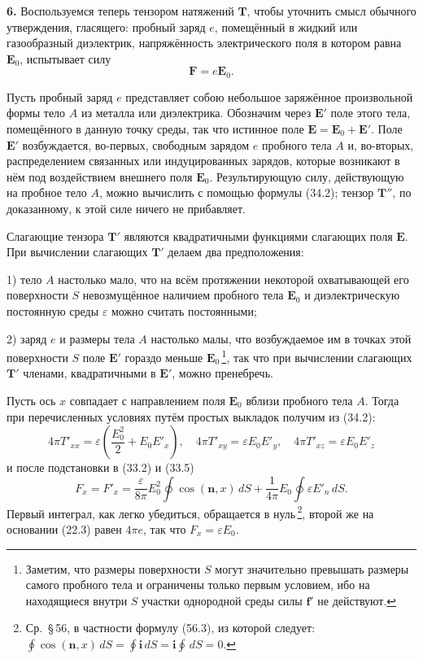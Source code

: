 \documentclass[a4paper,10pt]{article}
\begin{document}
\textbf{6.} Воспользуемся теперь тензором натяжений $\mathbf{T}$, чтобы
уточнить смысл обычного утверждения, гласящего: пробный заряд $e$,
помещённый в жидкий или газообразный диэлектрик, напряжённость
электрического поля в котором равна $\mathbf{E}_0$, испытывает силу
\begin{equation}
    \mathbf{F} = e\mathbf{E}_0.
    \tag{34.9}
\end{equation}

Пусть пробный заряд $e$ представляет собою небольшое заряжённое
произвольной формы тело $A$ из металла или диэлектрика. Обозначим через
$\mathbf{E}'$ поле этого тела, помещённого в данную точку среды, так
что истинное поле $\mathbf{E} = \mathbf{E}_0 + \mathbf{E}'$. Поле
$\mathbf{E}'$ возбуждается, во-первых, свободным зарядом $e$ пробного
тела $A$ и, во-вторых, распределением связанных или индуцированных
зарядов, которые возникают в нём под воздействием внешнего поля
$\mathbf{E}_0$. Результирующую силу, действующую на пробное тело $A$,
можно вычислить с помощью формулы (34.2); тензор $\mathbf{T}''$, по
доказанному, к этой силе ничего не прибавляет.

Слагающие тензора $\mathbf{T}'$ являются квадратичными функциями
слагающих поля $\mathbf{E}$. При вычислении слагающих $\mathbf{T}'$
делаем два предположения:

1) тело $A$ настолько мало, что на всём протяжении некоторой
охватывающей его поверхности $S$ невозмущённое наличием пробного тела
$\mathbf{E}_0$ и диэлектрическую постоянную среды $\varepsilon$ можно
считать постоянными;

2) заряд $e$ и размеры тела $A$ настолько малы, что возбуждаемое им
в точках этой поверхности $S$ поле $\mathbf{E}'$ гораздо меньше
$\mathbf{E}_0$\,\footnote{Заметим, что размеры поверхности $S$ могут
значительно превышать размеры самого пробного тела и ограничены только
первым условием, ибо на находящиеся внутри $S$ участки однородной среды
силы $\mathbf{f}'$ не действуют.}, так что при вычислении слагающих
$\mathbf{T}'$ членами, квадратичными в $\mathbf{E}'$, можно пренебречь.


Пусть ось $x$ совпадает с направлением поля $\mathbf{E}_0$ вблизи
пробного тела $A$. Тогда при перечисленных условиях путём простых
выкладок получим из (34.2):
$$
    4\pi T'_{xx} = \varepsilon\!\left(\frac{E_0^2}{2} + E_0 E'_x\right),
    \quad
    4\pi T'_{xy} = \varepsilon E_0 E'_y,
    \quad
    4\pi T'_{xz} = \varepsilon E_0 E'_z
$$
и после подстановки в (33.2) и (33.5)
$$
    F_x = F'_x = \frac{\varepsilon}{8\pi}E_0^2\oint\cos(\mathbf{n},x)\,dS
               + \frac{1}{4\pi}E_0\oint \varepsilon E'_n\,dS.
$$
Первый интеграл, как легко убедиться, обращается в нуль\,\footnote{Ср.\
§\,56, в частности формулу (56.3), из которой следует:
$\oint\cos(\mathbf{n},x)\,dS = \oint\mathbf{i}\,dS = \mathbf{i}\oint\,dS = 0$.},
второй же на основании (22.3) равен $4\pi e$, так что $F_x = \varepsilon E_0$.
\end{document}
